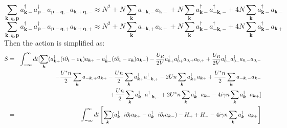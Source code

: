 \documentclass{article}
\newcommand{\nobracket}{}
\newcommand{\tmmathbf}[1]{\ensuremath{\boldsymbol{#1}}}
\begin{document}
\begin{equation}
  \sum_{\tmmathbf{k}, \tmmathbf{q}, \tmmathbf{p}} a_{\tmmathbf{k}-}^{\dagger}
  a_{\tmmathbf{p}-}^{\dagger} a_{\tmmathbf{p}-\tmmathbf{q}, -}
  a_{\tmmathbf{k}+\tmmathbf{q}, -} \approx N^2 + N \sum_{\tmmathbf{k}}
  a_{-\tmmathbf{k}, -} a_{\tmmathbf{k}-} + N \sum_{\tmmathbf{k}}
  a_{\tmmathbf{k}-}^{\dagger} a_{-\tmmathbf{k}, -}^{\dagger} + 4 N
  \sum_{\tmmathbf{k}} a_{\tmmathbf{k}-}^{\dagger} a_{\tmmathbf{k}-}
\end{equation}
\begin{equation}
  \sum_{\tmmathbf{k}, \tmmathbf{q}, \tmmathbf{p}} a_{\tmmathbf{k}-}^{\dagger}
  a_{\tmmathbf{p}-}^{\dagger} a_{\tmmathbf{p}-\tmmathbf{q}, +}
  a_{\tmmathbf{k}+\tmmathbf{q}, +} \approx N^2 + N \sum_{\tmmathbf{k}}
  a_{-\tmmathbf{k}, +} a_{\tmmathbf{k}+} + N \sum_{\tmmathbf{k}}
  a_{\tmmathbf{k}-}^{\dagger} a_{-\tmmathbf{k}, -}^{\dagger} + 4 N
  \sum_{\tmmathbf{k}} a_{\tmmathbf{k}-}^{\dagger} a_{\tmmathbf{k}+}
  \label{mean3}
\end{equation}
Then the action is simplified as:
\begin{eqnarray}
  S & = & \int_{- \infty}^{\infty} d t [\nobracket \sum_{\tmmathbf{k}}
  (a^{\dagger}_{\tmmathbf{k}+} (i \partial_t - \varepsilon_{\tmmathbf{k}})
  a_{\tmmathbf{k}+} - a^{\dagger}_{\tmmathbf{k}-} (i \partial_t -
  \varepsilon_{\tmmathbf{k}}) a_{\tmmathbf{k}-}) - \frac{U_R}{2 V} a_{0
  +}^{\dagger} a_{0 +}^{\dagger} a_{0, +} a_{0, +} + \frac{U_R}{2 V} a_{0
  -}^{\dagger} a_{0 -}^{\dagger} a_{0, -} a_{0, -} \nonumber\\
  &  & - \frac{U^{\ast} n}{2} \sum_{\tmmathbf{k}} a_{-\tmmathbf{k}, +}
  a_{\tmmathbf{k}+} - \frac{U n}{2} \sum_{\tmmathbf{k}}
  a_{\tmmathbf{k}+}^{\dagger} a_{-\tmmathbf{k}, +}^{\dagger} - 2 U n
  \sum_{\tmmathbf{k}} a_{\tmmathbf{k}+}^{\dagger} a_{\tmmathbf{k}+} +
  \frac{U^{\ast} n}{2} \sum_{\tmmathbf{k}} a_{-\tmmathbf{k}, -}
  a_{\tmmathbf{k}-} \nonumber\\
  &  & + \frac{U n}{2} \sum_{\tmmathbf{k}} a_{\tmmathbf{k}-}^{\dagger}
  a_{-\tmmathbf{k}, -}^{\dagger} + 2 U^{\ast} n \sum_{\tmmathbf{k}}
  a_{\tmmathbf{k}-}^{\dagger} a_{\tmmathbf{k}-} - 4 i \gamma n
  \sum_{\tmmathbf{k}} a_{\tmmathbf{k}-}^{\dagger} a_{\tmmathbf{k}+}
  \large{\large{}] \nobracket} \\
  & = & \int_{- \infty}^{\infty} d t \left[ \sum_{\tmmathbf{k}}
  (a^{\dagger}_{\tmmathbf{k}+} i \partial_t a_{\tmmathbf{k}+} -
  a^{\dagger}_{\tmmathbf{k}-} i \partial_t a_{\tmmathbf{k}-}) - H_+ + H_- - 4
  i \gamma n \sum_{\tmmathbf{k}} a_{\tmmathbf{k}-}^{\dagger} a_{\tmmathbf{k}+}
  \right] \label{action} 
\end{eqnarray}
\end{document}
